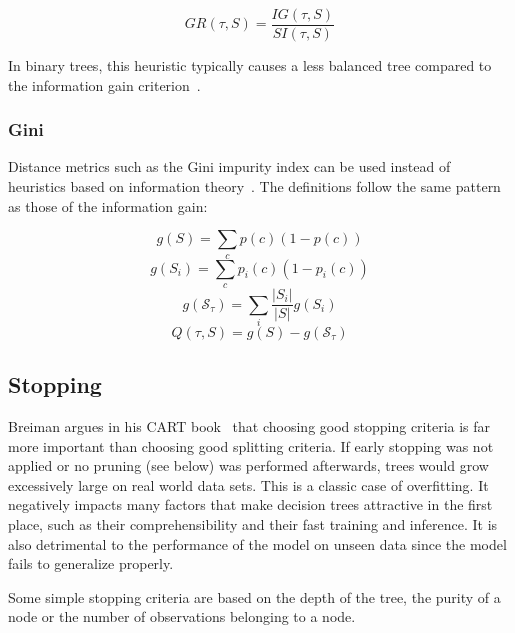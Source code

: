 \begin{equation}
    GR(\tau, S) = \frac{IG(\tau, S)}{SI(\tau, S)}
\end{equation}

In binary trees, this heuristic typically causes a less balanced tree compared to the information gain criterion~\cite{c45}.

\subsubsection{Gini}
Distance metrics such as the Gini impurity index can be used instead of heuristics based on information theory~\cite{cart}. The definitions follow the same pattern as those of the information gain:

\begin{equation}
    g(S) = \sum_c p(c)(1 - p(c))
\end{equation}
\begin{equation}
    g(S_i) = \sum_c p_i(c)(1-p_i(c))
\end{equation}
\begin{equation}
    g(\mathcal{S}_\tau) = \sum_i \frac{|S_i|}{|S|} g(S_i)
\end{equation}
\begin{equation}
    Q(\tau, S) = g(S) - g(\mathcal{S}_\tau)
\end{equation}


\subsection{Stopping}
Breiman argues in his CART book~\cite{cart} that choosing good stopping criteria is far more important than choosing good splitting criteria. If early stopping was not applied or no pruning (see below) was performed afterwards, trees would grow excessively large on real world data sets. This is a classic case of overfitting. It negatively impacts many factors that make decision trees attractive in the first place, such as their comprehensibility and their fast training and inference. It is also detrimental to the performance of the model on unseen data since the model fails to generalize properly.

Some simple stopping criteria are based on the depth of the tree, the purity of a node or the number of observations belonging to a node. 

